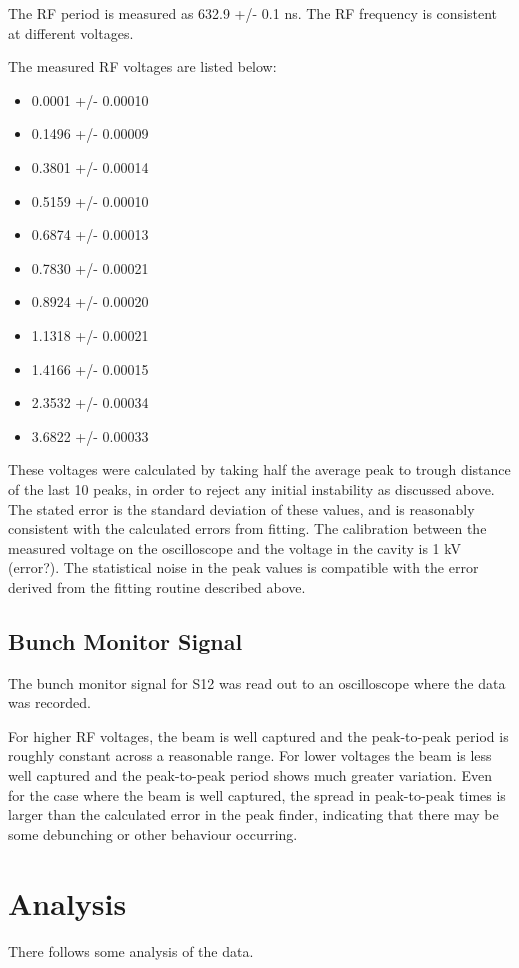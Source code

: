 \documentclass{paper}
\begin{document}
The RF period is measured as 632.9 +/- 0.1 ns. The RF frequency is consistent at 
different voltages.

The measured RF voltages are listed below:
\begin{itemize}
\item 0.0001 +/- 0.00010
\item 0.1496 +/- 0.00009
\item 0.3801 +/- 0.00014
\item 0.5159 +/- 0.00010
\item 0.6874 +/- 0.00013
\item 0.7830 +/- 0.00021
\item 0.8924 +/- 0.00020
\item 1.1318 +/- 0.00021
\item 1.4166 +/- 0.00015
\item 2.3532 +/- 0.00034
\item 3.6822 +/- 0.00033
\end{itemize}
These voltages were calculated by taking half the average peak to trough 
distance of the last 10 peaks, in order to reject any initial instability as
discussed above. The stated error is the standard deviation of these values, and
is reasonably consistent with the calculated errors from fitting. The 
calibration between the measured voltage on the oscilloscope and the voltage in 
the cavity is 1 kV (error?). The statistical noise in the peak values is 
compatible with the error derived from the fitting routine described above.

\subsection{Bunch Monitor Signal}
The bunch monitor signal for S12 was read out to an oscilloscope where the data
was recorded.

For higher RF voltages, the beam is well captured and the peak-to-peak period is
roughly constant across a reasonable range. For lower voltages the beam is less 
well captured and the peak-to-peak period shows much greater variation. Even for 
the case where the beam is well captured, the spread in peak-to-peak times is 
larger than the calculated error in the peak finder, indicating that there may 
be some debunching or other behaviour occurring.

\section{Analysis}
There follows some analysis of the data.
\end{document}
